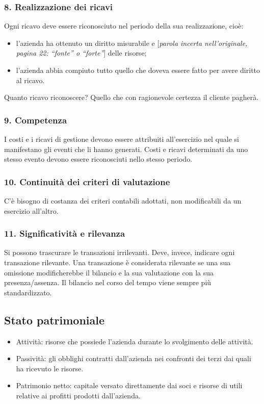 \documentclass[11pt,a4paper]{article}
\newcommand{\orig}[1]{\clearpage}
\begin{document}
\subsubsection*{8. Realizzazione dei ricavi}
Ogni ricavo deve essere riconosciuto nel periodo della sua realizzazione, cioè:
\begin{itemize}
\item l'azienda ha ottenuto un diritto misurabile e [\textit{parola incerta nell'originale, pagina 22: ``fonte'' o ``forte''}] delle risorse;
\item l'azienda abbia compiuto tutto quello che doveva essere fatto per avere diritto al ricavo.
\end{itemize}
Quanto ricavo riconoscere? Quello che con ragionevole certezza il cliente pagherà.
\orig{23}\subsubsection*{9. Competenza}
I costi e i ricavi di gestione devono essere attribuiti all'esercizio nel quale si manifestano gli eventi che li hanno generati.
Costi e ricavi determinati da uno stesso evento devono essere riconosciuti nello stesso periodo.
\subsubsection*{10. Continuità dei criteri di valutazione}
C'è bisogno di costanza dei criteri contabili adottati, non modificabili da un esercizio all'altro.
\subsubsection*{11. Significatività e rilevanza}
Si possono trascurare le transazioni irrilevanti. Deve, invece, indicare ogni transazione rilevante.
Una transazione è considerata rilevante se una sua omissione modificherebbe il bilancio e la sua valutazione con la sua presenza/assenza.
Il bilancio nel corso del tempo viene sempre più standardizzato.
\orig{24}\subsection*{Stato patrimoniale}
\begin{itemize}
\item Attività: risorse che possiede l'azienda durante lo svolgimento delle attività.
\item Passività: gli obblighi contratti dall'azienda nei confronti dei terzi dai quali ha ricevuto le risorse.
\item Patrimonio netto: capitale versato direttamente dai soci e risorse di utili relative ai profitti prodotti dall'azienda.
\end{itemize}
\end{document}
